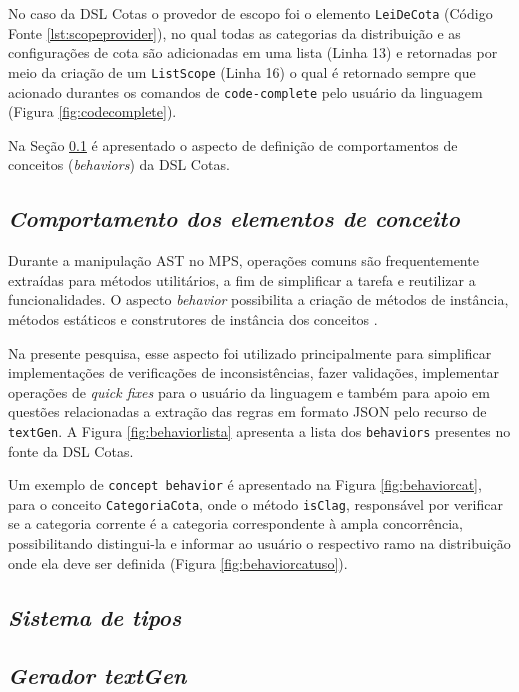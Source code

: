 No caso da DSL Cotas o provedor de escopo foi o elemento \texttt{LeiDeCota} (Código Fonte \ref{lst:scopeprovider}), no qual todas as categorias da distribuição e as configurações de cota são adicionadas em uma lista (Linha 13) e retornadas por meio da criação de um \texttt{ListScope} (Linha 16) o qual é retornado sempre que acionado durantes os comandos de \texttt{code-complete} pelo usuário da linguagem (Figura \ref{fig:codecomplete}).





Na Seção \ref{sub:sec:comportamentos} é apresentado o aspecto de definição de comportamentos de conceitos (\textit{behaviors}) da DSL Cotas.

\newpage
\subsection{\textit{Comportamento dos elementos de conceito}}
\label{sub:sec:comportamentos}

Durante a manipulação \gls{AST} no \gls{MPS}, operações comuns são frequentemente extraídas para métodos utilitários, a fim de simplificar a tarefa e reutilizar a funcionalidades. O aspecto \textit{behavior} possibilita a criação de métodos de instância, métodos estáticos e construtores de instância dos conceitos \cite{jetbrains}.

Na presente pesquisa, esse aspecto foi utilizado principalmente para simplificar implementações de verificações de inconsistências, fazer validações, implementar operações de \textit{quick fixes} para o usuário da linguagem e também para apoio em questões relacionadas a extração das regras em formato JSON pelo recurso de \texttt{textGen}. A Figura \ref{fig:behaviorlista} apresenta a lista dos \texttt{behaviors} presentes no fonte da DSL Cotas.



Um exemplo de \texttt{concept behavior} é apresentado na Figura \ref{fig:behaviorcat}, para o conceito \texttt{CategoriaCota}, onde o método \texttt{isClag}, responsável por verificar se a categoria corrente é a categoria correspondente à ampla concorrência, possibilitando distingui-la e informar ao usuário o respectivo ramo na distribuição onde ela deve ser definida (Figura \ref{fig:behaviorcatuso}).





\newpage
\subsection{\textit{Sistema de tipos}}
\label{sub:sec:typesystem}

\subsection{\textit{Gerador textGen}}
\label{sub:sec:texgen}